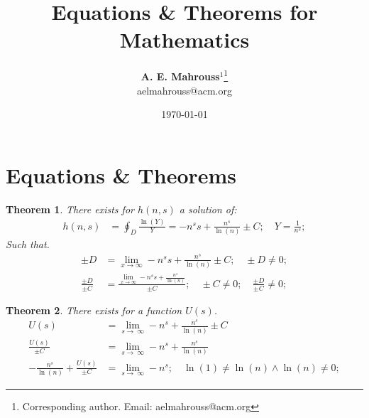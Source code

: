 \documentclass[10pt, twocolumn]{article}
\title{%
  \vspace{-1.5em}%
  \large\textbf{Equations \& Theorems for Mathematics}%
}
\author{%
  \textbf{A. E. Mahrouss}$^{1}$\thanks{Corresponding author. Email: aelmahrouss@acm.org}
  \\aelmahrouss@acm.org\\[0.4em]
}
\date{%
  \small \today
}
\theoremstyle{plain}
\newtheorem{theorem}{Theorem}[section]
\theoremstyle{definition}
\theoremstyle{remark}
\begin{document}

\twocolumn[{%
  \maketitle
  \vspace{-0.5em}
  \vspace{0.8em}
  \rule{\linewidth}{0.4pt}
  \vspace{1em}
}]


\section{Equations \& Theorems}
\begin{theorem}
  There exists for $h(n, s)$ a solution of:
  \begin{align*}
    h(n, s) &= \oint_{D} \frac{\ln(Y)}{Y} = -n^s s+\frac{n^s}{\ln \left(n\right)}\pm C; \quad Y = \frac{1}{n^s};
  \end{align*}
  Such that.
  \begin{align*}
  	\pm D &= \lim _{x\to \infty } -n^s s+\frac{n^s}{\ln \left(n\right)}\pm C; \quad \pm D \neq 0;\\
  	\frac{\pm D}{\pm C} &= \frac{\lim _{x\to \infty } -n^s s+\frac{n^s}{\ln \left(n\right)}}{\pm C}; \quad \pm C \neq 0; \quad \frac{\pm D}{\pm C} \neq 0;
  \end{align*}
\end{theorem}

\begin{theorem}
  There exists for a function $U(s)$.
  \begin{align*}
    U(s) &= \lim _{s\to \:\infty } -n^s+\frac{n^s}{\ln \left(n\right)}\pm C\\
    \frac{U(s) }{\pm C} &= \lim _{s\to \:\infty } -n^s+\frac{n^s}{\ln \left(n\right)}\\
    - \frac{n^s}{\ln \left(n\right)} + \frac{U(s) }{\pm C} &= \lim _{s\to \:\infty } -n^s; \quad \ln(1) \neq \ln(n) \wedge \ln(n) \neq 0;
  \end{align*}
\end{theorem}
\end{document}
